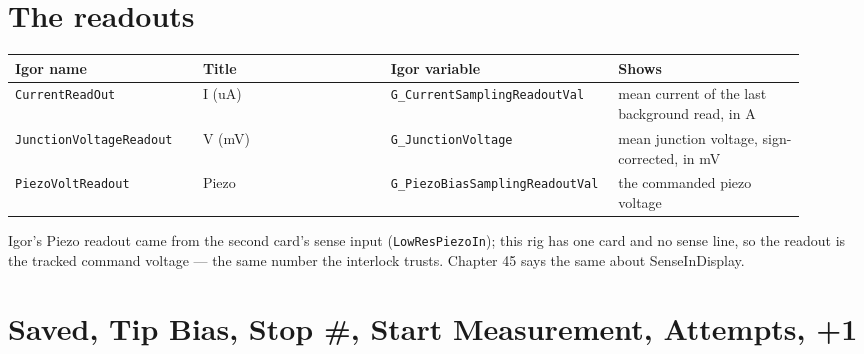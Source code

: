 \section{The readouts}

\small\setlength{\LTleft}{0pt}\setlength{\LTright}{\fill}
\begin{longtable}{@{}>{\raggedright\arraybackslash}p{0.230\linewidth}>{\raggedright\arraybackslash}p{0.230\linewidth}>{\raggedright\arraybackslash}p{0.230\linewidth}>{\raggedright\arraybackslash}p{0.230\linewidth}@{}}
\toprule
\textbf{Igor name} & \textbf{Title} & \textbf{Igor variable} & \textbf{Shows} \\
\midrule\endhead
\texttt{Current\discretionary{}{}{}Read\discretionary{}{}{}Out} & I (uA) & \texttt{G\_\discretionary{}{}{}Current\discretionary{}{}{}Sampling\discretionary{}{}{}Readout\discretionary{}{}{}Val} & mean current of the last background read, in \textmu{}A \\
\texttt{Junction\discretionary{}{}{}Voltage\discretionary{}{}{}Readout} & V (mV) & \texttt{G\_\discretionary{}{}{}Junction\discretionary{}{}{}Voltage} & mean junction voltage, sign-corrected, in mV \\
\texttt{Piezo\discretionary{}{}{}Volt\discretionary{}{}{}Readout} & Piezo & \texttt{G\_\discretionary{}{}{}Piezo\discretionary{}{}{}Bias\discretionary{}{}{}Sampling\discretionary{}{}{}Readout\discretionary{}{}{}Val} & the commanded piezo voltage \\
\bottomrule
\end{longtable}
\normalsize

Igor's Piezo readout came from the second card's sense input (\texttt{Low\discretionary{}{}{}Res\discretionary{}{}{}Piezo\discretionary{}{}{}In}); this rig has one card and no sense line, so the readout is the tracked command voltage --- the same number the interlock trusts. Chapter 45 says the same about SenseInDisplay.

\section{Saved, Tip Bias, Stop \#, Start Measurement, Attempts, +1}

